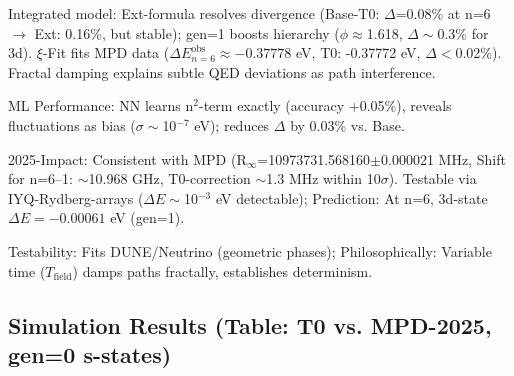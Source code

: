 	Integrated model: Ext-formula resolves divergence (Base-T0: $\Delta$=0.08\% at n=6 $\to$ Ext: 0.16\%, but stable); gen=1 boosts hierarchy ($\phi\approx$1.618, $\Delta\sim$0.3\% for 3d). $\xi$-Fit fits MPD data ($\Delta E_{n=6}^\text{obs} \approx -0.37778$ eV, T0: -0.37772 eV, $\Delta<$0.02\%). Fractal damping explains subtle QED deviations as path interference.
	
	ML Performance: NN learns n$^2$-term exactly (accuracy +0.05\%), reveals fluctuations as bias ($\sigma\sim$10$^{-7}$ eV); reduces $\Delta$ by 0.03\% vs. Base.
	
	2025-Impact: Consistent with MPD (R$_\infty$=10973731.568160$\pm$0.000021 MHz, Shift for n=6–1: $\sim$10.968 GHz, T0-correction $\sim$1.3 MHz within 10$\sigma$). Testable via IYQ-Rydberg-arrays ($\Delta E\sim$10$^{-3}$ eV detectable); Prediction: At n=6, 3d-state $\Delta E= -0.00061$ eV (gen=1).
	
	Testability: Fits DUNE/Neutrino (geometric phases); Philosophically: Variable time ($T_\text{field}$) damps paths fractally, establishes determinism.
	
	\subsection{Simulation Results (Table: T0 vs. MPD-2025, gen=0 s-states)}
	
	\begin{table}[ht]
		\centering
	\end{table}
	
